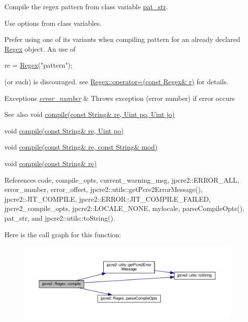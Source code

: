 Compile the regex pattern from class variable \hyperlink{classjpcre2_1_1Regex_a0bceb85b6dbba355b56b5cc312214435}{pat\+\_\+str}. 

Use options from class variables.

Prefer using one of its variants when compiling pattern for an already declared \hyperlink{classjpcre2_1_1Regex}{Regex} object. An use of 
\begin{DoxyCode}
re = \hyperlink{classjpcre2_1_1Regex_a302f65cd5747c5d34570ca76516ab715}{Regex}(\textcolor{stringliteral}{"pattern"});
\end{DoxyCode}
 (or such) is discouraged. see {\ttfamily \hyperlink{classjpcre2_1_1Regex_ab43a14b4b6e75b7fa3221bc18a1d4121}{Regex\+::operator=(const Regex\& r)}} for details. 
\begin{DoxyExceptions}{Exceptions}
{\em \hyperlink{classjpcre2_1_1Regex_a91b7b795c9efe76ef4e015325ff33f1c}{error\+\_\+number}} & Throws exception (error number) if error occurs \\
\hline
\end{DoxyExceptions}
\begin{DoxySeeAlso}{See also}
void \hyperlink{classjpcre2_1_1Regex_a4640915bc907aa3b80da543f1eb7e74f}{compile(const String\& re, Uint po, Uint jo)} 

void \hyperlink{classjpcre2_1_1Regex_a01394dcb222c4d442cabbffb4bcf570a}{compile(const String\& re, Uint po)} 

void \hyperlink{classjpcre2_1_1Regex_acd49e856009160c622e90b81b6557d8d}{compile(const String\& re, const String\& mod)} 

void \hyperlink{classjpcre2_1_1Regex_a81687ca434654cae776c2854c3618de0}{compile(const String\& re)} 
\end{DoxySeeAlso}


References code, compile\+\_\+opts, current\+\_\+warning\+\_\+msg, jpcre2\+::\+E\+R\+R\+O\+R\+\_\+\+A\+LL, error\+\_\+number, error\+\_\+offset, jpcre2\+::utils\+::get\+Pcre2\+Error\+Message(), jpcre2\+::\+J\+I\+T\+\_\+\+C\+O\+M\+P\+I\+LE, jpcre2\+::\+E\+R\+R\+O\+R\+::\+J\+I\+T\+\_\+\+C\+O\+M\+P\+I\+L\+E\+\_\+\+F\+A\+I\+L\+ED, jpcre2\+\_\+compile\+\_\+opts, jpcre2\+::\+L\+O\+C\+A\+L\+E\+\_\+\+N\+O\+NE, mylocale, parse\+Compile\+Opts(), pat\+\_\+str, and jpcre2\+::utils\+::to\+String().



Here is the call graph for this function\+:\nopagebreak
\begin{figure}[H]
\begin{center}
\leavevmode
\includegraphics[width=350pt]{classjpcre2_1_1Regex_aad1d5ef1e87f762f68a587eec4022e69_cgraph}
\end{center}
\end{figure}


